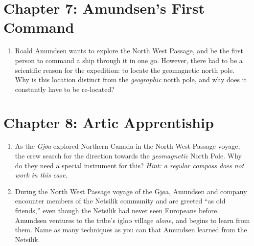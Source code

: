 \documentclass{article}
\begin{document}
\section{Chapter 7: Amundsen's First Command}

\begin{enumerate}
\item Roald Amundsen wants to explore the North West Passage, and be the first person to command a ship through it in one go.  However, there had to be a scientific reason for the expedition: to locate the geomagnetic north pole.  Why is this location distinct from the \textit{geographic} north pole, and why does it constantly have to be re-located? \\ \vspace{3cm}
\end{enumerate}

\section{Chapter 8: Artic Apprentiship}

\begin{enumerate}
\item As the \textit{Gj{\o}a} explored Northern Canada in the North West Passage voyage, the crew search for the direction towards the \textit{geomagnetic} North Pole.  Why do they need a special instrument for this?  \textit{Hint: a regular compass does not work in this case}. \\ \vspace{3cm}
\item During the North West Passage voyage of the Gj{\o}a, Amundsen and company encounter members of the Netsilik community and are greeted ``as old friends,'' even though the Netsilik had never seen Europeans before.  Amundsen ventures to the tribe's igloo village \textit{alone,} and begins to learn from them.  Name as many techniques as you can that Amundsen learned from the Netsilik.
\end{enumerate}
\end{document}
